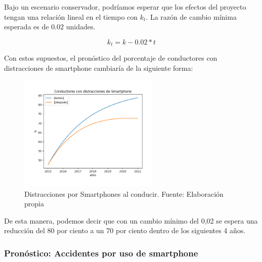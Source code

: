 \documentclass{article}
\begin{document}
Bajo un escenario conservador, podríamos esperar que los efectos del proyecto tengan una relación lineal en el tiempo
con $k_t$. La razón de cambio mínima esperada es de $0.02$ unidades.

\begin{equation}
k_{t} = k - 0.02 * t
\end{equation}

Con estos supuestos, el pronóstico del porcentaje de conductores con distracciones de smartphone cambiaría de la
siguiente forma:

	\begin{figure}[H]\centering
	\includegraphics[width=0.6\textwidth]{resources/img/distraction_compare_img.png}
	\caption{\label{fig:smart_accidents_compare} Distracciones por Smartphones al conducir. Fuente: Elaboración propia}
    \end{figure}

De esta manera, podemos decir que con un cambio mínimo del 0,02 se espera una reducción del 80 por ciento  a un 70 por ciento dentro de los siguientes 4 años.

\subsubsection{Pronóstico: Accidentes por uso de smartphone}
\end{document}
